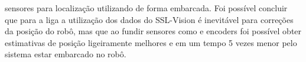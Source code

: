 \documentclass[acronym, symbols, table]{fei}
\begin{document}
\begin{resumo}
sensores para localização utilizando  de forma embarcada. Foi possível concluir que para a liga  a utilização dos dados do SSL-Vision é inevitável para correções da posição do robô, mas que ao fundir sensores como  e encoders foi possível obter estimativas de posição ligeiramente melhores e em um tempo 5 vezes menor pelo sistema estar embarcado no robô.
	

\end{resumo}

\begin{abstract}
	
	


\end{abstract}
\end{document}
